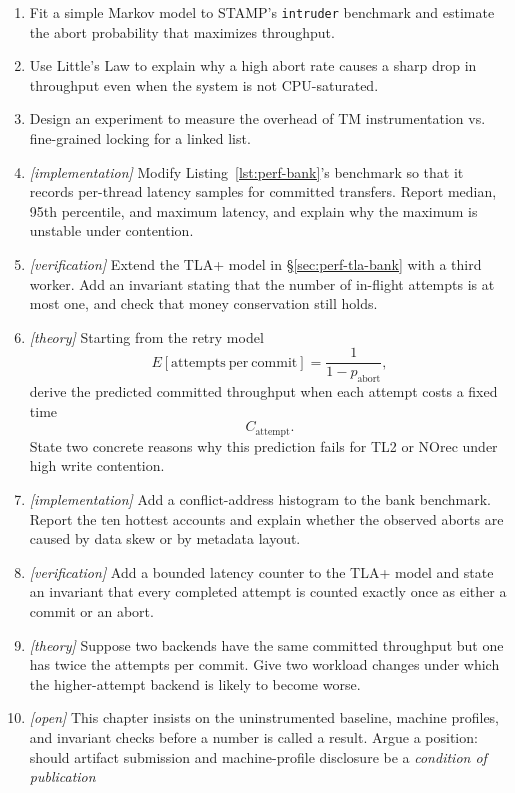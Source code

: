 \begin{enumerate}
    \item Fit a simple Markov model to STAMP’s \texttt{intruder} benchmark and estimate the abort probability that maximizes throughput.
    \item Use Little’s Law to explain why a high abort rate causes a sharp drop in throughput even when the system is not CPU-saturated.
    \item Design an experiment to measure the overhead of TM instrumentation vs. fine-grained locking for a linked list.
    \item \emph{[implementation]} Modify Listing~\ref{lst:perf-bank}'s benchmark so that it records per-thread latency samples for committed transfers. Report median, 95th percentile, and maximum latency, and explain why the maximum is unstable under contention.
    \item \emph{[verification]} Extend the TLA+ model in \S\ref{sec:perf-tla-bank} with a third worker. Add an invariant stating that the number of in-flight attempts is at most one, and check that money conservation still holds.
    \item \emph{[theory]} Starting from the retry model
    $$
    E[\mathrm{attempts\ per\ commit}] =
    \frac{1}{1-p_{\mathrm{abort}}},
    $$
    derive the predicted committed throughput when each attempt costs a fixed time
    $$
    C_{\mathrm{attempt}}.
    $$
    State two concrete reasons why this prediction fails for TL2 or NOrec under high write contention.
    \item \emph{[implementation]} Add a conflict-address histogram to the bank benchmark. Report the ten hottest accounts and explain whether the observed aborts are caused by data skew or by metadata layout.
    \item \emph{[verification]} Add a bounded latency counter to the TLA+ model and state an invariant that every completed attempt is counted exactly once as either a commit or an abort.
    \item \emph{[theory]} Suppose two backends have the same committed throughput but one has twice the attempts per commit. Give two workload changes under which the higher-attempt backend is likely to become worse.
    \item \emph{[open]} This chapter insists on the uninstrumented baseline,
          machine profiles, and invariant checks before a number is called a
          result.  Argue a position: should artifact submission and
          machine-profile disclosure be a \emph{condition of publication}

\end{enumerate}
